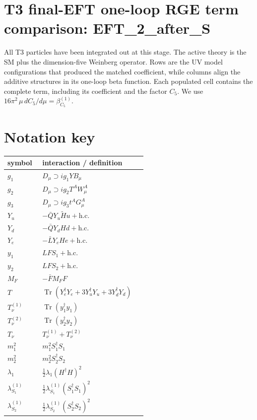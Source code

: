 \documentclass[8pt]{article}
\begin{document}
\begin{landscape}
\section*{T3 final-EFT one-loop RGE term comparison: EFT\_2\_after\_S}
All T3 particles have been integrated out at this stage. The active theory is the SM plus the dimension-five Weinberg operator. Rows are the UV model configurations that produced the matched coefficient, while columns align the additive structures in its one-loop beta function. Each populated cell contains the complete term, including its coefficient and the factor $C_5$.
\medskip
We use $16\pi^2\,\mu\,dC_5/d\mu=\beta_{C_5}^{(1)}$.
\section*{Notation key}
\begin{longtable}{@{}p{0.23\linewidth}p{0.69\linewidth}@{}}
\toprule
symbol & interaction / definition \\
\midrule
$g_1$ & $D_\mu\supset i g_1YB_\mu$ \\
$g_2$ & $D_\mu\supset i g_2T^AW_\mu^A$ \\
$g_3$ & $D_\mu\supset i g_3t^AG_\mu^A$ \\
$Y_u$ & $-\bar QY_u\widetilde Hu+\mathrm{h.c.}$ \\
$Y_d$ & $-\bar QY_dHd+\mathrm{h.c.}$ \\
$Y_e$ & $-\bar LY_eHe+\mathrm{h.c.}$ \\
$y_1$ & $LFS_1+\mathrm{h.c.}$ \\
$y_2$ & $LFS_2+\mathrm{h.c.}$ \\
$M_F$ & $-\bar FM_FF$ \\
$T$ & $\operatorname{Tr}(Y_e^\dagger Y_e+3Y_u^\dagger Y_u+3Y_d^\dagger Y_d)$ \\
$T_\nu^{(1)}$ & $\operatorname{Tr}(y_1^\dagger y_1)$ \\
$T_\nu^{(2)}$ & $\operatorname{Tr}(y_2^\dagger y_2)$ \\
$T_\nu$ & $T_\nu^{(1)}+T_\nu^{(2)}$ \\
$m_1^2$ & $m_1^2S_1^\dagger S_1$ \\
$m_2^2$ & $m_2^2S_2^\dagger S_2$ \\
$\lambda_1$ & $\frac12\lambda_1(H^\dagger H)^2$ \\
$\lambda_{S_1}^{(1)}$ & $\frac12\lambda_{S_1}^{(1)}(S_1^\dagger S_1)^2$ \\
$\lambda_{S_2}^{(1)}$ & $\frac12\lambda_{S_2}^{(1)}(S_2^\dagger S_2)^2$ \\

\end{longtable}
\end{landscape}
\end{document}
